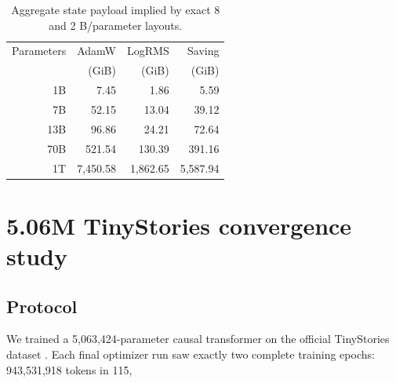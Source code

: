 \documentclass[10pt,twocolumn]{article}
\begin{document}
\begin{table}[t]
\centering
\caption{Aggregate state payload implied by exact 8 and 2 B/parameter layouts.}
\label{tab:scale}
\small
\begin{tabular}{rrrr}
\toprule
Parameters & AdamW & LogRMS & Saving \\
 & (GiB) & (GiB) & (GiB) \\
\midrule
1B & 7.45 & 1.86 & 5.59 \\
7B & 52.15 & 13.04 & 39.12 \\
13B & 96.86 & 24.21 & 72.64 \\
70B & 521.54 & 130.39 & 391.16 \\
1T & 7,450.58 & 1,862.65 & 5,587.94 \\
\bottomrule
\end{tabular}
\end{table}

\section{5.06M TinyStories convergence study}

\subsection{Protocol}

We trained a 5,063,424-parameter causal transformer on the official TinyStories
dataset \cite{eldan2023tinystories}. Each final optimizer run saw exactly two
complete training epochs: 943,531,918 tokens in 115,
\end{document}
